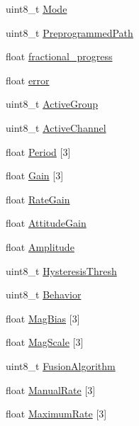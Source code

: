 \begin{DoxyCompactItemize}
uint8\-\_\-t \hyperlink{struct____attribute_____ae9f6a35ab82662a153d3f2039a720235}{\-Mode}
\item 
uint8\-\_\-t \hyperlink{struct____attribute_____afc0b0538f8fc87b4787c646fae4ee0c2}{\-Preprogrammed\-Path}
\item 
float \hyperlink{struct____attribute_____a54b9c2e09ce973c29028de6f8791bf2f}{fractional\-\_\-progress}
\item 
float \hyperlink{struct____attribute_____ae3699ce68f1527145cc32efa7538e479}{error}
\item 
uint8\-\_\-t \hyperlink{struct____attribute_____a4efe2c7e3e1bbbdc16ddf39eb9deeb89}{\-Active\-Group}
\item 
uint8\-\_\-t \hyperlink{struct____attribute_____ab99b2b1de4c16481f8ae458093df886c}{\-Active\-Channel}
\item 
float \hyperlink{struct____attribute_____a460cc0f96b27e16732d3cce8a5454e7a}{\-Period} \mbox{[}3\mbox{]}
\item 
float \hyperlink{struct____attribute_____a648ad51312a270678ed70bc0d3d369a6}{\-Gain} \mbox{[}3\mbox{]}
\item 
float \hyperlink{struct____attribute_____ac26050e5ce9a16045d872d313d5d02fc}{\-Rate\-Gain}
\item 
float \hyperlink{struct____attribute_____a425e1c6f543067ec27ec074ca6f8e9e1}{\-Attitude\-Gain}
\item 
float \hyperlink{struct____attribute_____a186af0f787f2e2596ce916832706b641}{\-Amplitude}
\item 
uint8\-\_\-t \hyperlink{struct____attribute_____adaa69547dc164c300a970e8ec282fc3f}{\-Hysteresis\-Thresh}
\item 
uint8\-\_\-t \hyperlink{struct____attribute_____a55704f82c5bf39f1d0ddddb0f170cecb}{\-Behavior}
\item 
float \hyperlink{struct____attribute_____a076e1ef0723c72dd8b7d003024642c73}{\-Mag\-Bias} \mbox{[}3\mbox{]}
\item 
float \hyperlink{struct____attribute_____af938e1a40972566be73e1216aa77f983}{\-Mag\-Scale} \mbox{[}3\mbox{]}
\item 
uint8\-\_\-t \hyperlink{struct____attribute_____a9df38e042d07da534ef56c6d0853b311}{\-Fusion\-Algorithm}
\item 
float \hyperlink{struct____attribute_____a9e7aa721ebbaedf867ea9b9edac022c9}{\-Manual\-Rate} \mbox{[}3\mbox{]}
\item 
float \hyperlink{struct____attribute_____a4c25d3c6452c1b029a0dfb1c1ddf6858}{\-Maximum\-Rate} \mbox{[}3\mbox{]}

\end{DoxyCompactItemize}
